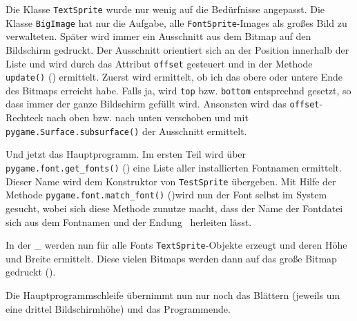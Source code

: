 Die Klasse \texttt{TextSprite} wurde nur wenig auf die Bedürfnisse angepasst. Die Klasse \texttt{BigImage} hat nur die Aufgabe, alle \texttt{FontSprite}-Images als großes Bild zu verwalteten. Später wird immer ein Ausschnitt aus dem Bitmap auf den Bildschirm gedruckt. Der Ausschnitt orientiert sich an der Position innerhalb der Liste und wird durch das Attribut \texttt{offset} gesteuert und in der Methode \texttt{update()} () ermittelt. Zuerst wird ermittelt, ob ich das obere oder untere Ende des Bitmaps erreicht habe. Falls ja, wird \texttt{top} bzw. \texttt{bottom} entsprechnd gesetzt, so dass immer der ganze Bildschirm gefüllt wird. Ansonsten wird das \texttt{offset}-Rechteck nach oben bzw. nach unten verschoben und mit \texttt{pygame.Surface.subsurface()} der Ausschnitt ermittelt.


Und jetzt das Hauptprogramm. Im ersten Teil wird über \texttt{pygame.font.get\_fonts()} () eine Liste aller installierten Fontnamen ermittelt. Dieser Name wird dem Konstruktor von \texttt{TestSprite} übergeben. Mit Hilfe der Methode \texttt{pygame.font.match\_font()} ()wird nun der Font selbst im System gesucht, wobei sich diese Methode zunutze macht, dass der Name der Fontdatei sich aus dem Fontnamen und der Endung~ herleiten lässt.

\newpage
{} 

In der \forSchleife\_ werden nun für alle Fonts \texttt{TextSprite}-Objekte erzeugt und deren Höhe und Breite ermittelt. Diese vielen Bitmaps werden dann auf das große Bitmap gedruckt ().


Die Hauptprogrammschleife übernimmt nun nur noch das Blättern (jeweils um eine drittel Bildschirmhöhe) und das Programmende.

